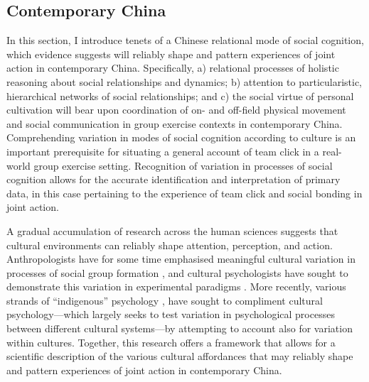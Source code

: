 \begin{CJK}{UTF8}{gbsn}







\subsection{Contemporary China\label{sect:ChinaRelational}}
In this section, I introduce tenets of a Chinese relational mode of social cognition, which evidence suggests will reliably shape and pattern experiences of joint action in contemporary China.  Specifically, a) relational processes of holistic reasoning about social relationships and dynamics; b) attention to particularistic, hierarchical networks of social relationships;  and c) the social virtue of personal cultivation will bear upon coordination of on- and off-field physical movement and social communication in group exercise contexts in contemporary China.  Comprehending variation in modes of social cognition according to culture is an important prerequisite for situating a general account of team click in a real-world group exercise setting.  Recognition of variation in processes of social cognition allows for the accurate identification and interpretation of primary data, in this case pertaining to the experience of team click and social bonding in joint action.

A gradual accumulation of research across the human sciences suggests that cultural environments can reliably shape attention, perception, and action.  Anthropologists have for some time emphasised meaningful cultural variation in processes of social group formation \citep{Strodtbeck1961,Kluckhohn1961,Mead1967,Fei1992}, and cultural psychologists have sought to demonstrate this variation in experimental paradigms \citep{Markus1991,Nisbett2001}.  More recently, various strands of ``indigenous'' psychology \citep[e.g., Chinese indigenous psychology, see ][]{Liu2009}, have sought to compliment cultural psychology---which largely seeks to test variation in psychological processes between different cultural systems---by attempting to account also for variation within cultures.  Together, this research offers a framework that allows for a scientific description of the various cultural affordances that may reliably shape and pattern experiences of joint action in contemporary China.


\end{CJK}
